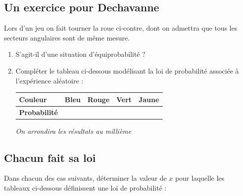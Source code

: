 \documentclass[oneside,12pt]{article}          %
\begin{document}
\subsection{Un exercice pour Dechavanne}
\begin{minipage}{0.25\linewidth}
\end{minipage}
\begin{minipage}{0.75\linewidth}
	Lors d'un jeu on fait tourner la roue ci-contre, dont on admettra que tous les secteurs angulaires sont de même mesure.
	\begin{enumerate}
		\item S'agit-il d'une situation d'équiprobabilité ?
		\item Compléter le tableau ci-dessous modélisant la loi de probabilité associée à l'expérience aléatoire :
		
		\renewcommand{\arraystretch}{1.5}
		\begin{tabular}{| P{3cm} | P{2cm} | P{2cm} | P{2cm} | P{2cm} |} \hline
			 \textbf{Couleur} & Bleu & Rouge & Vert & Jaune \\ \hline
			 \textbf{Probabilité} & & & & \\ \hline
		\end{tabular} 
		
		\phantom{}\hspace{3cm}\textit{\small On arrondira les résultats au millième}
	\end{enumerate}
\end{minipage}



\subsection{Chacun fait sa loi}
Dans chacun des cas suivants, déterminer la valeur de $x$ pour laquelle les tableaux ci-dessous définissent une loi de probabilité :
\end{document}
